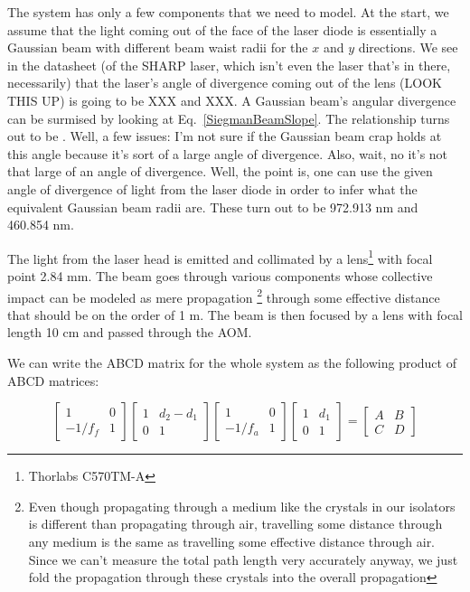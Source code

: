 The system has only a few components that we need to model. At the start, we assume that the light coming out of the face of the laser diode is essentially a Gaussian beam with different beam waist radii for the $x$ and $y$ directions. We see in the datasheet (of the SHARP laser, which isn't even the laser that's in there, necessarily) that the laser's angle of divergence coming out of the lens (LOOK THIS UP) is going to be XXX and XXX. A Gaussian beam's angular divergence can be surmised by looking at Eq.\ \ref{SiegmanBeamSlope}. The relationship turns out to be \cite{MellesGriotGaussian}. Well, a few issues: I'm not sure if the Gaussian beam crap holds at this angle because it's sort of a large angle of divergence. Also, wait, no it's not that large of an angle of divergence. Well, the point is, one can use the given angle of divergence of light from the laser diode in order to infer what the equivalent Gaussian beam radii are. These turn out to be 972.913 nm and 460.854 nm. 

The light from the laser head is emitted and collimated by a lens\footnote{Thorlabs C570TM-A} with focal point 2.84 mm.%
 The beam goes through various components whose collective impact can be modeled as mere propagation 
\footnote{Even though propagating through a medium like the crystals in our isolators is different than propagating through air, travelling some distance through any medium is the same as travelling some effective distance through air. Since we can't measure the total path length very accurately anyway, we just fold the propagation through these crystals into the overall propagation}
through some effective distance that should be on the order of 1 m. The beam is then focused by a lens with focal length 10 cm and passed through the AOM. 

We can write the ABCD matrix for the whole system as the following product of ABCD matrices: 

\begin{equation}
\begin{bmatrix}
1 & 0 \\ -1/f_{f} & 1
\end{bmatrix}
\begin{bmatrix}
1 & d_2-d_1 \\ 0 & 1
\end{bmatrix}
\begin{bmatrix}
1 & 0 \\ -1/f_{a} & 1
\end{bmatrix}
\begin{bmatrix}
1 & d_1 \\ 0 & 1
\end{bmatrix}
=
\begin{bmatrix}
A & B \\ C & D
\end{bmatrix}
\end{equation}

